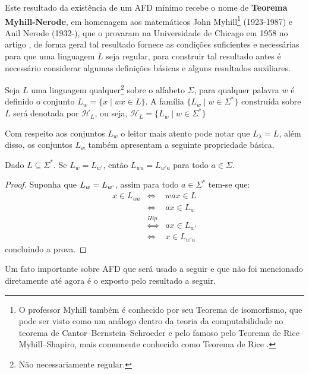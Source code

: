Este resultado da existência de um AFD mínimo recebe o nome de \textbf{Teorema Myhill-Nerode}, em homenagem aos matemáticos John Myhill\footnote{O professor Myhill também é conhecido por seu Teorema de isomorfismo\cite{myhill1957-isomorfismo}, que pode ser visto como um análogo dentro da teoria da computabilidade ao teorema de Cantor–Bernstein–Schroeder e pelo famoso pelo Teorema  de Rice–Myhill–Shapiro, mais comumente conhecido como Teorema de Rice \cite{benjaLivro2010, rice1953-teorema-Rice}.} (1923-1987) e Anil Nerode (1932-), que o provaram na Universidade de Chicago em 1958 no artigo \cite{nerode1958}, de forma geral tal resultado fornece as condições suficientes e necessárias para que uma linguagem $L$ seja regular, para construir tal resultado antes é necessário considerar algumas definições básicas e alguns resultados auxiliares.

\begin{definition}\label{def:FamiliaH-L}
	Seja $L$ uma linguagem qualquer\footnote{Não necessariamente regular.} sobre o alfabeto $\Sigma$, para qualquer palavra $w$ é definido o conjunto $L_w = \{x \mid wx \in L\}$. A família $\{L_w \mid w \in \Sigma^*\}$ construída sobre $L$ será denotada por $\mathcal{H}_L$, ou seja, $\mathcal{H}_L = \{L_w \mid w \in \Sigma^*\}$
\end{definition}

Com respeito aos conjuntos $L_w$ o leitor mais atento pode notar que $L_\lambda = L$, além disso,  os conjuntos $L_w$ também apresentam a seguinte propriedade básica.

\begin{prop}
	Dado $L \subseteq \Sigma^*$. Se $L_w = L_{w'}$, então $L_{wa} = L_{w'a}$ para todo $a \in \Sigma$.
\end{prop}

\begin{proof}
	Suponha que $L_w = L_{w`}$, assim para todo $a \in \Sigma^*$ tem-se que:
	\begin{eqnarray*}
		x \in L_{wa} &\Longleftrightarrow & wax \in L\\
		& \Longleftrightarrow  & ax \in L_w\\
		& \stackrel{Hip.}{\Longleftrightarrow} & ax \in L_{w'}\\
		& \Longleftrightarrow  & x \in L_{w'a}
	\end{eqnarray*}
	concluindo a prova.
\end{proof}

Um fato importante sobre AFD que será usado a seguir e que não foi mencionado diretamente até agora é o exposto pelo resultado a seguir.

